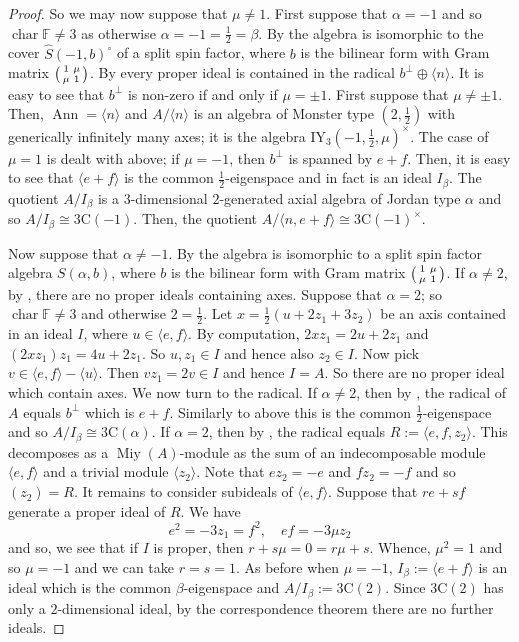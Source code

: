 \documentclass[11pt, a4paper]{article}
\theoremstyle{plain}
\theoremstyle{definition}
\newcommand\al{\alpha}
\newcommand\bt{\beta}
\newcommand\la{\langle}
\newcommand\ra{\rangle}
\DeclareMathOperator{\ch}{char}
\DeclareMathOperator{\Ann}{Ann}
\newcommand\FF{\mathbb{F}}
\newcommand{\C}{\mathrm{C}}
\newcommand{\IY}{\mathrm{IY}}
\DeclareMathOperator{\Miy}{Miy}
\newcommand{\0}{\overline{0}}
\newcommand{\2}{\overline{2}}
\newcommand{\1}{\mathbbm{1}}
\begin{document}
\begin{proof}
So we may now suppose that $\mu \neq 1$.  First suppose that $\al = -1$ and so $\ch \FF \neq 3$ as otherwise $\al = -1 = \frac{1}{2} = \bt$.  By \cite[Theorem 6.9]{splitspin} the algebra is isomorphic to the cover $\widehat{S}(-1,b)^\circ$ of a split spin factor, where $b$ is the bilinear form with Gram matrix $\begin{psmallmatrix} 1 & \mu \\ \mu & 1 \end{psmallmatrix}$.  By \cite[Theorem 6.8]{splitspin} every proper ideal is contained in the radical $b^\perp \oplus \la n \ra$.  It is easy to see that $b^\perp$ is non-zero if and only if $\mu = \pm 1$.  First suppose that $\mu \neq \pm 1$.  Then, $\Ann = \la n \ra$ and $A/\la n \ra$ is an algebra of Monster type $(2, \frac{1}{2})$ with generically infinitely many axes; it is the algebra $\IY_3(-1, \frac{1}{2}, \mu)^\times$.   The case of $\mu = 1$ is dealt with above; if $\mu=-1$, then $b^\perp$ is spanned by $e+f$. Then, it is easy to see that $\la e+f \ra$ is the common $\frac{1}{2}$-eigenspace and in fact is an ideal $I_\bt$.  The quotient $A/I_\bt$ is a $3$-dimensional $2$-generated axial algebra of Jordan type $\al$ and so $A/I_\bt \cong 3\C(-1)$.  Then, the quotient $A/\la n, e+f \ra \cong 3\C(-1)^\times$.

Now suppose that $\al \neq -1$.  By \cite[Theorem 5.1]{splitspin} the algebra is isomorphic to a split spin factor algebra $S(\al,b)$, where $b$ is the bilinear form with Gram matrix $\begin{psmallmatrix} 1 & \mu \\ \mu & 1 \end{psmallmatrix}$.  If $\al \neq 2$, by \cite[Proposition 4.3]{splitspin}, there are no proper ideals containing axes.  Suppose that $\al = 2$; so $\ch \FF \neq 3$ and otherwise $2 = \frac{1}{2}$.  Let $x = \frac{1}{2}(u + 2 z_1 + 3 z_2)$ be an axis contained in an ideal $I$, where $u \in \la e,f \ra$.  By computation, $2xz_1 = 2u + 2z_1$ and $(2xz_1)z_1 = 4u + 2z_1$.  So $u, z_1 \in I$ and hence also $z_2 \in I$.  Now pick $v \in \la e,f \ra - \la u \ra$.  Then $vz_1 = 2v \in I$ and hence $I = A$.  So there are no proper ideal which contain axes.  We now turn to the radical.  If $\al \neq 2$, then by \cite[Proposition 4.3]{splitspin}, the radical of $A$ equals $b^\perp$ which is $e+f$.  Similarly to above this is the common $\frac{1}{2}$-eigenspace and so $A/I_\bt \cong 3\C(\al)$.  If $\al=2$, then by \cite[Proposition 4.1]{splitspin}, the radical equals $R  := \la e,f,z_2 \ra$.  This decomposes as a $\Miy(A)$-module as the sum of an indecomposable module $\la e,f \ra$ and a trivial module $\la z_2\ra$.  Note that $ez_2 = -e$ and $fz_2 = -f$ and so $(z_2) = R$.  It remains to consider subideals of $\la e,f \ra$.  Suppose that $re + sf$ generate a proper ideal of $R$.  We have
\[
e^2 = -3z_1 = f^2, \quad ef = -3\mu z_2
\]
and so, we see that if $I$ is proper, then $r+s\mu = 0 = r\mu + s$.  Whence, $\mu^2=1$ and so $\mu = -1$ and we can take $r=s=1$.  As before when $\mu = -1$, $I_\bt := \la e+f \ra$ is an ideal which is the common $\bt$-eigenspace and $A/I_\bt :=3\C(2)$.  Since $3\C(2)$ has only a $2$-dimensional ideal, by the correspondence theorem there are no further ideals.
\end{proof}
\end{document}
